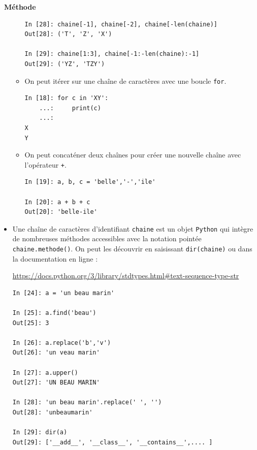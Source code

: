 \documentclass[a4paper, french, 12pt]{article}  %
\newenvironment{methode}[1]
{\par \medskip    \noindent  
 \begin {bclogo}[arrondi =0.1,logo=\bcoutil, marge=4,noborder = true] {~\textbf{Méthode}   {\itshape #1} }  \par}
{
\end{bclogo}
 \par \bigskip }
\begin{document}
\begin{methode}{}
\begin{itemize}[label=]
\begin{itemize}
\begin{lstlisting}
In [28]: chaine[-1], chaine[-2], chaine[-len(chaine)]
Out[28]: ('T', 'Z', 'X')

In [29]: chaine[1:3], chaine[-1:-len(chaine):-1]
Out[29]: ('YZ', 'TZY')
\end{lstlisting}

\item On peut itérer sur une chaîne de caractères avec une boucle \texttt{for}.

\begin{lstlisting}
In [18]: for c in 'XY':
    ...:     print(c)
    ...:     
X
Y
\end{lstlisting}
\item On peut concaténer deux chaînes pour créer une nouvelle chaîne avec l'opérateur \texttt{+}.
\begin{lstlisting}
In [19]: a, b, c = 'belle','-','ile'

In [20]: a + b + c
Out[20]: 'belle-ile'
\end{lstlisting}
\end{itemize}
\item Une chaîne de caractères d'identifiant \texttt{chaine} est un objet \texttt{Python} qui intègre  de nombreuses méthodes accessibles avec la notation pointée \texttt{chaine.methode()}. On peut les découvrir en saisissant \texttt{dir(chaine)} ou dans la documentation en ligne :

\url{https://docs.python.org/3/library/stdtypes.html#text-sequence-type-str} 

\begin{lstlisting}
In [24]: a = 'un beau marin'

In [25]: a.find('beau')
Out[25]: 3

In [26]: a.replace('b','v')
Out[26]: 'un veau marin'

In [27]: a.upper()
Out[27]: 'UN BEAU MARIN'

In [28]: 'un beau marin'.replace(' ', '')
Out[28]: 'unbeaumarin'

In [29]: dir(a)
Out[29]: ['__add__', '__class__', '__contains__',.... ]
\end{lstlisting}
\end{itemize}
\end{methode}

\end{document}
